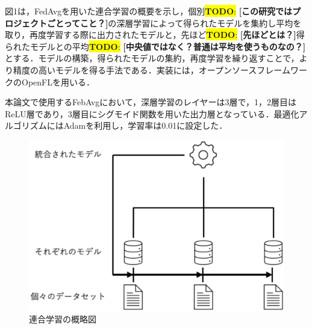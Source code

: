 \documentclass[uplatex,dvipdfmx,a4paper,twocolumn,base=11pt,jbase=11pt,ja=standard]{bxjsarticle}  %
\newcommand{\todo}[1]{\colorbox{yellow}{{\bf TODO}:}{\color{red} {\textbf{[#1]}}}}
\begin{document}
図1は，FedAvgを用いた連合学習の概要を示し，個別\todo{この研究ではプロジェクトごとってこと？}の深層学習によって得られたモデルを集約し平均を取り，再度学習する際に出力されたモデルと，先ほど\todo{先ほどとは？}得られたモデルとの平均\todo{中央値ではなく？普通は平均を使うものなの？}とする．モデルの構築，得られたモデルの集約，再度学習を繰り返すことで，より精度の高いモデルを得る手法である．実装には，オープンソースフレームワークのOpenFLを用いる．

本論文で使用するFebAvgにおいて，深層学習のレイヤーは3層で，1，2層目はReLU層であり，3層目にシグモイド関数を用いた出力層となっている．最適化アルゴリズムにはAdamを利用し，学習率は0.01に設定した．



\begin{figure}
\begin{center}
\includegraphics[width=0.9\linewidth]{federated_learning_exp.eps}
\caption{連合学習の概略図}
\label{fig:test}
\end{center}
\end{figure}



\begin{table}[t]
\vspace{0mm}
 \centering
 \caption{分析結果}
\label{tab:result3}
\end{table}
\end{document}
